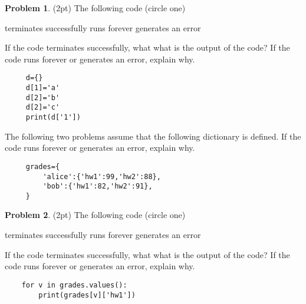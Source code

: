 \documentclass[10pt]{article}
\theoremstyle{definition}
\newtheorem{problem}{Problem}
\begin{document}
\begin{problem}
    (2pt)
    The following code (circle one)
    
    \vspace{0.25in}
    \hspace{0.5in}terminates successfully
    \hspace{1in}runs forever
    \hspace{1in}generates an error
    \vspace{0.25in}

    \noindent
    If the code terminates successfully, what what is the output of the code?
    If the code runs forever or generates an error, explain why.
\end{problem}
\begin{lstlisting}
     d={}
     d[1]='a'
     d[2]='b'
     d[2]='c'
     print(d['1'])
\end{lstlisting}
\vspace{2in}
\newpage
     \noindent
     The following two problems assume that the following dictionary is defined.
    If the code runs forever or generates an error, explain why.
     \begin{lstlisting}
     grades={
         'alice':{'hw1':99,'hw2':88},
         'bob':{'hw1':82,'hw2':91},
     }
     \end{lstlisting}
\begin{problem}
    (2pt)
    The following code (circle one)
    
    \vspace{0.25in}
    \hspace{0.5in}terminates successfully
    \hspace{1in}runs forever
    \hspace{1in}generates an error
    \vspace{0.25in}

    \noindent
    If the code terminates successfully, what what is the output of the code?
    If the code runs forever or generates an error, explain why.
\end{problem}
\begin{lstlisting}
    for v in grades.values():
        print(grades[v]['hw1'])
\end{lstlisting}
\vspace{2.5in}
\end{document}
